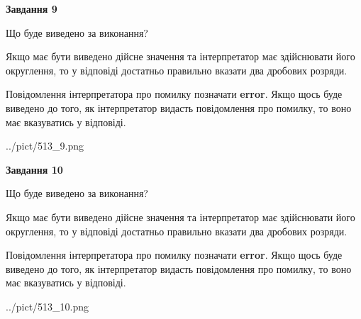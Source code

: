 \documentclass[12pt, ukrainian]{article}
\begin{document}
{\begin {Large}
{\begin {center}\textbf{Завдання 9}\end {center}}\par
Що буде виведено за виконання? \par

Якщо має бути виведено дійсне значення та інтерпретатор має здійснювати його округлення, 
то у відповіді достатньо правильно вказати два дробових розряди.

Повідомлення інтерпретатора про помилку позначати \textbf{error}.
Якщо щось буде виведено до того, як інтерпретатор видасть повідомлення про помилку, 
то воно має вказуватись у відповіді. \par

\begin{center}
	{../pict/513_9.png}
\end{center}
\newpage

{\begin {center}\textbf{Завдання 10}\end {center}}\par
Що буде виведено за виконання? \par

Якщо має бути виведено дійсне значення та інтерпретатор має здійснювати його округлення, 
то у відповіді достатньо правильно вказати два дробових розряди.

Повідомлення інтерпретатора про помилку позначати \textbf{error}.
Якщо щось буде виведено до того, як інтерпретатор видасть повідомлення про помилку, 
то воно має вказуватись у відповіді. \par

\begin{center}
	{../pict/513_10.png}
\end{center}
\newpage

\end {Large}}
\end{document}
